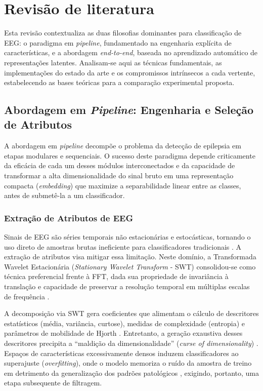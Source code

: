 \documentclass[alpha-refs,brazilian]{CC-EC_TF-TC}
\begin{document}
\section{Revisão de literatura}

Esta revisão contextualiza as duas filosofias dominantes para classificação de EEG: o paradigma em \textit{pipeline}, fundamentado na engenharia explícita de características, e a abordagem \textit{end-to-end}, baseada no aprendizado automático de representações latentes. Analisam-se aqui as técnicas fundamentais, as implementações do estado da arte e os compromissos intrínsecos a cada vertente, estabelecendo as bases teóricas para a comparação experimental proposta.

\subsection{Abordagem em \textit{Pipeline}: Engenharia e Seleção de Atributos}

A abordagem em \textit{pipeline} decompõe o problema da detecção de epilepsia em etapas modulares e sequenciais. O sucesso deste paradigma depende criticamente da eficácia de cada um desses módulos interconectados e da capacidade de transformar a alta dimensionalidade do sinal bruto em uma representação compacta (\textit{embedding}) que maximize a separabilidade linear entre as classes, antes de submetê-la a um classificador.

\subsubsection{Extração de Atributos de EEG}

Sinais de EEG são séries temporais não estacionárias e estocásticas, tornando o uso direto de amostras brutas ineficiente para classificadores tradicionais \citep{Lotte2018}. A extração de atributos visa mitigar essa limitação. Neste domínio, a Transformada Wavelet Estacionária (\textit{Stationary Wavelet Transform} - SWT) consolidou-se como técnica preferencial frente à FFT, dada sua propriedade de invariância à translação e capacidade de preservar a resolução temporal em múltiplas escalas de frequência \citep{Adeli2003, Subasi2010}.

A decomposição via SWT gera coeficientes que alimentam o cálculo de descritores estatísticos (média, variância, curtose), medidas de complexidade (entropia) e parâmetros de mobilidade de Hjorth \citep{Hjorth1970, Acharya2013EEG}. Entretanto, a geração exaustiva desses descritores precipita a ``maldição da dimensionalidade'' (\textit{curse of dimensionality}) \citep{Guyon2003}. Espaços de características excessivamente densos induzem classificadores ao superajuste (\textit{overfitting}), onde o modelo memoriza o ruído da amostra de treino em detrimento da generalização dos padrões patológicos \citep{Dash1997}, exigindo, portanto, uma etapa subsequente de filtragem.
\end{document}
